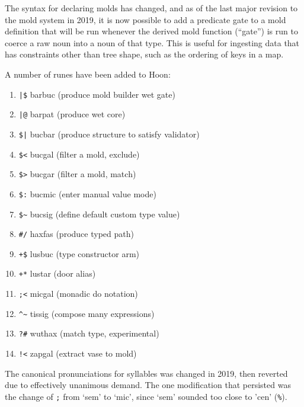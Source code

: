 \documentclass[twoside]{article}
\begin{document}
The syntax for declaring molds has changed, and as of the last major revision to the mold system in 2019, it is now possible to add a predicate gate to a mold definition that will be run whenever the derived mold function (``gate'') is run to coerce a raw noun into a noun of that type.  This is useful for ingesting data that has constraints other than tree shape, such as the ordering of keys in a map.

A number of runes have been added to Hoon:

\begin{enumerate}
  \item  \lstinline[style=inlinecode]{|$} barbuc (produce mold builder wet gate)
  \item  \lstinline[style=inlinecode]{|@} barpat (produce wet core)
  \item  \lstinline[style=inlinecode]{$|} bucbar (produce structure to satisfy validator)
  \item  \lstinline[style=inlinecode]{$<} bucgal (filter a mold, exclude)
  \item  \lstinline[style=inlinecode]{$>} bucgar (filter a mold, match)
  \item  \lstinline[style=inlinecode]{$:} bucmic (enter manual value mode)
  \item  \lstinline[style=inlinecode]{$~} bucsig (define default custom type value)
  \item  \lstinline[style=inlinecode]{#/} haxfas (produce typed path)
  \item  \lstinline[style=inlinecode]{+$} lusbuc (type constructor arm)
  \item  \lstinline[style=inlinecode]{+*} lustar (door alias)
  \item  \lstinline[style=inlinecode]{;<} micgal (monadic do notation)
  \item  \lstinline[style=inlinecode]{^~} tissig (compose many expressions)
  \item  \lstinline[style=inlinecode]{?#} wuthax (match type, experimental)
  \item  \lstinline[style=inlinecode]{!<} zapgal (extract vase to mold)
\end{enumerate}

The canonical pronunciations for syllables was changed in 2019, then reverted due to effectively unanimous demand.  The one modification that persisted was the change of \lstinline[style=inlinecode]{;} from `sem' to `mic', since `sem' sounded too close to 'cen' (\lstinline[style=inlinecode]{%}).
\end{document}

